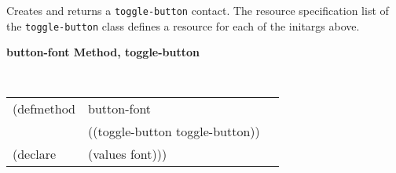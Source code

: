 \begin{flushright} \parbox[t]{6.125in}{
Creates and returns a {\tt toggle-button} contact.
The resource specification list of the {\tt toggle-button} class defines
a resource for each of the initargs above.


}\end{flushright}


%
%
%
%


{\samepage  
{\large {\bf button-font \hfill Method, toggle-button}}
\begin{flushright} \parbox[t]{6.125in}{
\tt
\begin{tabular}{lll}
\raggedright
(defmethod & button-font & \\
& ((toggle-button  toggle-button)) \\
(declare & (values font)))
\end{tabular}
\rm

}\end{flushright}}

